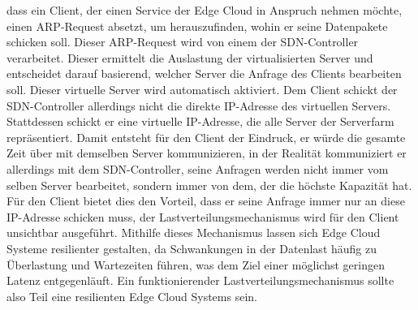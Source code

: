 dass ein Client, der einen Service der Edge Cloud in Anspruch nehmen möchte, einen ARP-Request absetzt, um herauszufinden, wohin er seine Datenpakete schicken soll. 
Dieser ARP-Request wird von einem der SDN-Controller verarbeitet. Dieser ermittelt die Auslastung der virtualisierten Server und entscheidet darauf basierend, welcher Server die Anfrage des Clients bearbeiten soll. 
Dieser virtuelle Server wird automatisch aktiviert. Dem Client schickt der SDN-Controller allerdings nicht die direkte IP-Adresse des virtuellen Servers. Stattdessen schickt er eine virtuelle IP-Adresse, 
die alle Server der Serverfarm repräsentiert. Damit entsteht für den Client der Eindruck, er würde die gesamte Zeit über mit demselben Server kommunizieren, in der Realität kommuniziert er allerdings mit dem SDN-Controller, 
seine Anfragen werden nicht immer vom selben Server bearbeitet, sondern immer von dem, der die höchste Kapazität hat. Für den Client bietet dies den Vorteil, dass er seine Anfrage immer nur an diese IP-Adresse schicken muss, 
der Lastverteilungsmechanismus wird für den Client unsichtbar ausgeführt. Mithilfe dieses Mechanismus lassen sich Edge Cloud Systeme resilienter gestalten, da Schwankungen in der Datenlast häufig zu Überlastung und Wartezeiten führen, was dem Ziel einer möglichst geringen Latenz entgegenläuft. Ein funktionierender Lastverteilungsmechanismus sollte also Teil eine resilienten Edge Cloud Systems sein.

